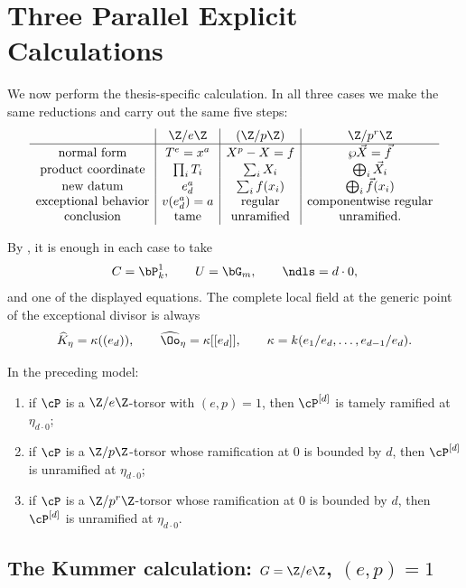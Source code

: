 \section{Three Parallel Explicit Calculations}

We now perform the thesis-specific calculation. In all three cases we make the
same reductions and carry out the same five steps:
\[
\begin{array}{c|c|c|c}
&\Z/e\Z&(\Z/p\Z)&\Z/p^r\Z\\ \hline
\text{normal form}&T^e=x^a&X^p-X=f&\wp\vec X=\vec f\\
\text{product coordinate}&\prod_iT_i&\sum_iX_i&\bigoplus_i\vec X_i\\
\text{new datum}&e_d^a&\sum_i f(x_i)&\bigoplus_i\vec f(x_i)\\
\text{exceptional behavior}&v(e_d^a)=a&\text{regular}&\text{componentwise regular}\\
\text{conclusion}&\text{tame}&\text{unramified}&\text{unramified}.
\end{array}
\]

By , it is enough in each
case to take
\[
 C=\bP^1_k,\qquad U=\bG_m,\qquad \ndls=d\cdot0,
\]
and one of the displayed equations. The complete local field at the generic
point of the exceptional divisor is always
\[
   \widehat K_\eta=\kappa((e_d)),
   \qquad \widehat\Oo_\eta=\kappa[[e_d]],
   \qquad \kappa=k(e_1/e_d,\dots,e_{d-1}/e_d).
\]

\begin{theorem}\label{theorem:ramification_after_blowup_P1}
In the preceding model:
\begin{enumerate}
 \item if $\cP$ is a $\Z/e\Z$-torsor with $(e,p)=1$, then
 $\cP^{[d]}$ is tamely ramified at $\eta_{d\cdot0}$;
 \item if $\cP$ is a $\Z/p\Z$-torsor whose ramification at $0$ is bounded by
 $d$, then $\cP^{[d]}$ is unramified at $\eta_{d\cdot0}$;
 \item if $\cP$ is a $\Z/p^r\Z$-torsor whose ramification at $0$ is bounded by
 $d$, then $\cP^{[d]}$ is unramified at $\eta_{d\cdot0}$.
\end{enumerate}
\end{theorem}

\subsection{\texorpdfstring{The Kummer calculation: $G=\Z/e\Z$, $(e,p)=1$}{The Kummer calculation}}

